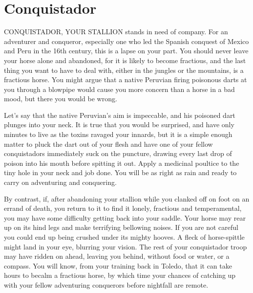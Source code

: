 \chapter{Conquistador}
CONQUISTADOR, YOUR STALLION stands in need of company. For an adventurer and conqueror, especially one who led the Spanish conquest of Mexico and Peru in the 16th century, this is a lapse on your part. You should never leave your horse alone and abandoned, for it is likely to become fractious, and the last thing you want to have to deal with, either in the jungles or the mountains, is a fractious horse. You might argue that a native Peruvian firing poisonous darts at you through a blowpipe would cause you more concern than a horse in a bad mood, but there you would be wrong.

Let's say that the native Peruvian's aim is impeccable, and his poisoned dart plunges into your neck. It is true that you would be surprised, and have only minutes to live as the toxins ravaged your innards, but it is a simple enough matter to pluck the dart out of your flesh and have one of your fellow conquistadors immediately suck on the puncture, drawing every last drop of poison into his mouth before spitting it out. Apply a medicinal poultice to the tiny hole in your neck and job done. You will be as right as rain and ready to carry on adventuring and conquering.

By contrast, if, after abandoning your stallion while you clanked off on foot on an errand of death, you return to it to find it lonely, fractious and temperamental, you may have some difficulty getting back into your saddle. Your horse may rear up on its hind legs and make terrifying bellowing noises. If you are not careful you could end up being crushed under its mighty hooves. A fleck of horse-spittle might land in your eye, blurring your vision. The rest of your conquistador troop may have ridden on ahead, leaving you behind, without food or water, or a compass. You will know, from your training back in Toledo, that it can take hours to becalm a fractious horse, by which time your chances of catching up with your fellow adventuring conquerors before nightfall are remote.

